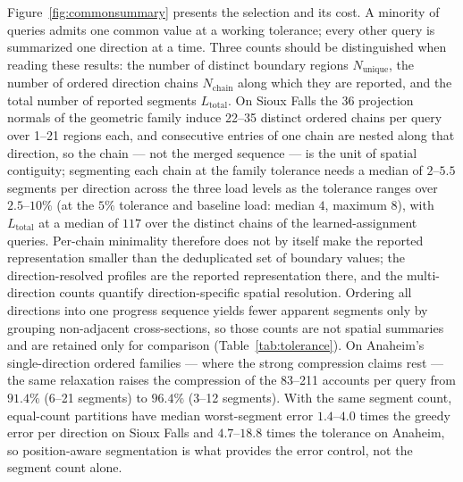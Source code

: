 Figure~\ref{fig:commonsummary} presents the selection and its cost. A
minority of queries admits one common value at a working tolerance;
every other query is summarized one direction at a time. Three counts
should be distinguished when reading these results: the number of
distinct boundary regions $N_{\mathrm{unique}}$, the number of ordered
direction chains $N_{\mathrm{chain}}$ along which they are reported,
and the total number of reported segments $L_{\mathrm{total}}$. On
Sioux Falls the 36 projection normals of the geometric family induce
22--35 distinct ordered chains per query over 1--21 regions each, and
consecutive entries of one chain are nested along that
direction, so the chain --- not the merged sequence --- is the unit of
spatial contiguity; segmenting each chain at the family tolerance
needs a median of $2$--$5.5$ segments per direction across the three
load levels as the tolerance ranges over $2.5$--$10\%$ (at the $5\%$
tolerance and baseline load: median $4$, maximum $8$), with
$L_{\mathrm{total}}$ at a median of $117$ over the distinct chains of
the learned-assignment queries. Per-chain minimality therefore does
not by itself make the reported representation smaller than the
deduplicated set of boundary values; the direction-resolved profiles
are the reported representation there, and the multi-direction counts
quantify direction-specific spatial resolution. Ordering all
directions into one progress sequence yields fewer apparent segments
only by grouping non-adjacent cross-sections, so those counts are not
spatial summaries and are retained only for comparison
(Table~\ref{tab:tolerance}). On Anaheim's single-direction ordered
families --- where the strong compression claims rest --- the same
relaxation raises the compression of the 83--211 accounts
per query from $91.4\%$ (6--21 segments) to $96.4\%$ (3--12
segments). With the same segment count, equal-count partitions have
median worst-segment error $1.4$--$4.0$ times the greedy error per
direction on Sioux Falls and $4.7$--$18.8$ times the tolerance on
Anaheim, so position-aware segmentation is what provides the error
control, not the segment count alone.

